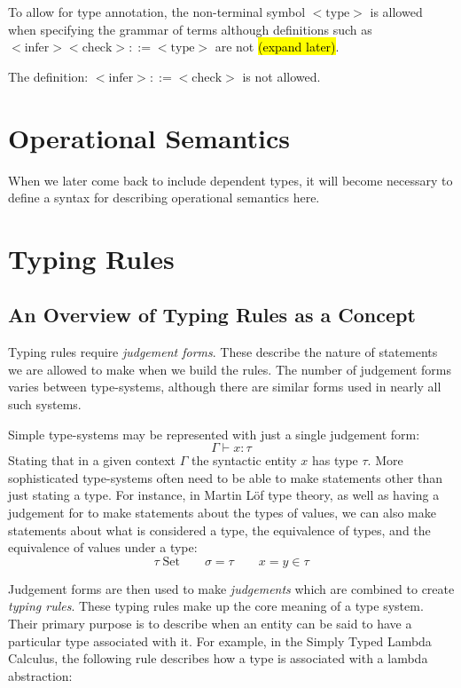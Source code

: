 To allow for type annotation, the non-terminal symbol $<\mbox{type}>$
is allowed when specifying the grammar of terms although definitions
such as $<\mbox{infer}> <\mbox{check}> ::= <\mbox{type}>$ are not
\hl{(expand later)}.

The definition: $<\mbox{infer}> ::= <\mbox{check}>$ is not allowed.

\section{Operational Semantics}

When we later come back to include dependent types, it will become
necessary to define a syntax for describing operational semantics here.

\section{Typing Rules}

\subsection{An Overview of Typing Rules as a Concept}

Typing rules require \emph{judgement forms}. These describe the nature
of statements we are allowed to make when we build the rules. The
number of judgement forms varies between type-systems, although there
are similar forms used in nearly all such systems.

Simple type-systems may be represented with just a single judgement
form:
$$\boxed{\Gamma \vdash x : \tau}$$
Stating that in a given context $\Gamma$ the syntactic entity
$x$ has type $\tau$. More sophisticated type-systems often need to be
able to make statements other than just stating a type. For instance,
in Martin L\"of type theory, as well as having a judgement for to make
statements about the types of values, we can also make statements
about what is considered a type, the equivalence of types, and the
equivalence of values under a type:
$$\boxed{\tau \; \mbox{Set}} \qquad \boxed{\sigma = \tau} \qquad \boxed{x = y
  \in \tau}$$

Judgement forms are then used to make \emph{judgements} which are
combined to create \emph{typing rules}. These typing rules make up the
core meaning of a type system. Their primary purpose is to describe
when an entity can be said to have a particular type associated with
it. For example, in the Simply Typed Lambda Calculus, the following
rule describes how a type is associated with a lambda abstraction:

